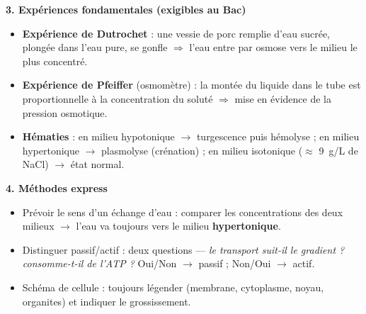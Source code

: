 \documentclass[11pt]{article}
\newcommand{\cle}[1]{{\popxbold\color{popdark}#1}}
\begin{document}
\begin{bilan}
\textbf{3. Expériences fondamentales (exigibles au Bac)}
\begin{itemize}
  \item \textbf{Expérience de Dutrochet} : une vessie de porc remplie d'eau sucrée, plongée dans l'eau pure, se gonfle $\Rightarrow$ l'eau entre par osmose vers le milieu le plus concentré.
  \item \textbf{Expérience de Pfeiffer} (osmomètre) : la montée du liquide dans le tube est proportionnelle à la concentration du soluté $\Rightarrow$ mise en évidence de la \cle{pression osmotique}.
  \item \textbf{Hématies} : en milieu hypotonique $\rightarrow$ turgescence puis hémolyse ; en milieu hypertonique $\rightarrow$ plasmolyse (crénation) ; en milieu isotonique ($\approx$ \SI{9}{g/L} de NaCl) $\rightarrow$ état normal.
\end{itemize}

\textbf{4. Méthodes express}
\begin{itemize}
  \item Prévoir le sens d'un échange d'eau : comparer les concentrations des deux milieux $\rightarrow$ l'eau va toujours vers le milieu \textbf{hypertonique}.
  \item Distinguer passif/actif : deux questions --- \emph{le transport suit-il le gradient ?} \emph{consomme-t-il de l'ATP ?} Oui/Non $\rightarrow$ passif ; Non/Oui $\rightarrow$ actif.
  \item Schéma de cellule : toujours légender (membrane, cytoplasme, noyau, organites) et indiquer le grossissement.
\end{itemize}
\end{bilan}
\end{document}
